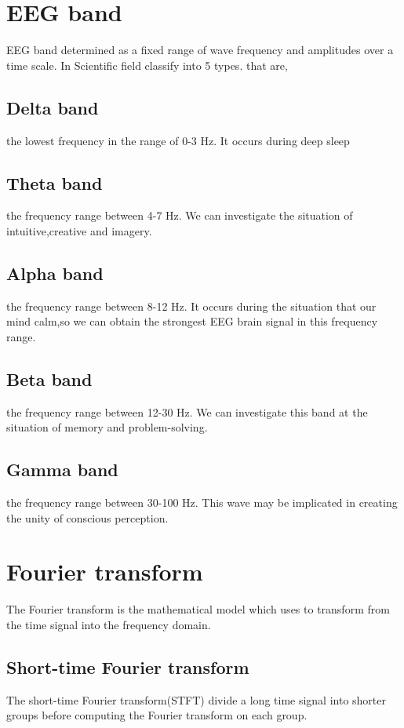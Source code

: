 \newpage
\section{EEG band}
\hspace{1.5cm}EEG band determined as a fixed range of wave frequency and amplitudes over a time scale. In Scientific field classify into 5 types. that are,

\subsection{Delta band} the lowest frequency in the range of 0-3 Hz. It occurs during deep sleep

\subsection{Theta band} the frequency range between 4-7 Hz. We can investigate the situation of intuitive,creative and imagery. 

\subsection{Alpha band} the frequency range between 8-12 Hz. It occurs during the situation that our mind calm,so we can obtain the strongest EEG brain signal in this frequency range.

\subsection{Beta band} the frequency range between 12-30 Hz. We can investigate this band at the situation of memory and problem-solving.

\subsection{Gamma band}the frequency range between 30-100 Hz. This wave may be implicated in creating the unity of conscious perception. 

\section{Fourier transform}
The Fourier transform is the mathematical model which uses to transform from the time signal into the frequency domain.

\subsection{Short-time Fourier transform} 
The short-time Fourier transform(STFT) divide a long time signal into shorter groups before computing the Fourier transform on each group.

